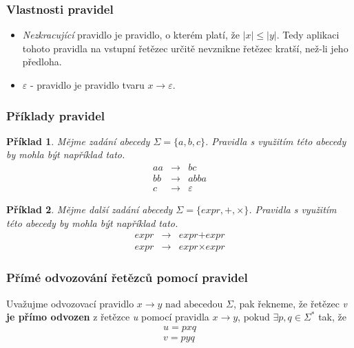 \documentclass[10pt, a4paper, titlepage]{article}
\theoremstyle{note}
\newtheorem{priklad}{\textbf{Příklad}}
\begin{document}
\subsubsection{Vlastnosti pravidel}
\begin{itemize}
\item \emph{Nezkracující} pravidlo je pravidlo, o kterém platí, že $|x| \leq |y|$. Tedy aplikaci tohoto pravidla na vstupní řetězec určitě nevznikne řetězec kratší, než-li jeho předloha.

\item $\varepsilon$ - pravidlo je pravidlo tvaru $x \rightarrow \varepsilon$.
\end{itemize}

\subsubsection{Příklady pravidel}
\begin{priklad}
Mějme zadání abecedy $\Sigma = \lbrace a,b,c \rbrace$. Pravidla s využitím této abecedy by mohla být například tato.
\begin{eqnarray*}
aa &\rightarrow& bc \\
bb &\rightarrow& abba \\
c &\rightarrow& \varepsilon
\end{eqnarray*}
\end{priklad}

\begin{priklad}
Mějme další zadání abecedy $\Sigma = \lbrace expr, +, \times \rbrace$. Pravidla s využitím této abecedy by mohla být například tato.
\begin{eqnarray*}
\textit{expr} &\rightarrow& \textit{expr} + \textit{expr} \\
\textit{expr} &\rightarrow& \textit{expr} \times \textit{expr}
\end{eqnarray*}
\end{priklad}

\subsubsection{Přímé odvozování řetězců pomocí pravidel}
Uvažujme odvozovací pravidlo $ x \rightarrow y \text{ nad abecedou } \Sigma$, pak řekneme, že řetězec \emph{v} \textbf{je přímo odvozen}
z řetězce \emph{u} pomocí pravidla $ x \rightarrow y $, pokud $\exists p, q \in \Sigma^{*}$ tak, že
\begin{gather*}
u = p x q \\
v = p y q
\end{gather*}
\end{document}
